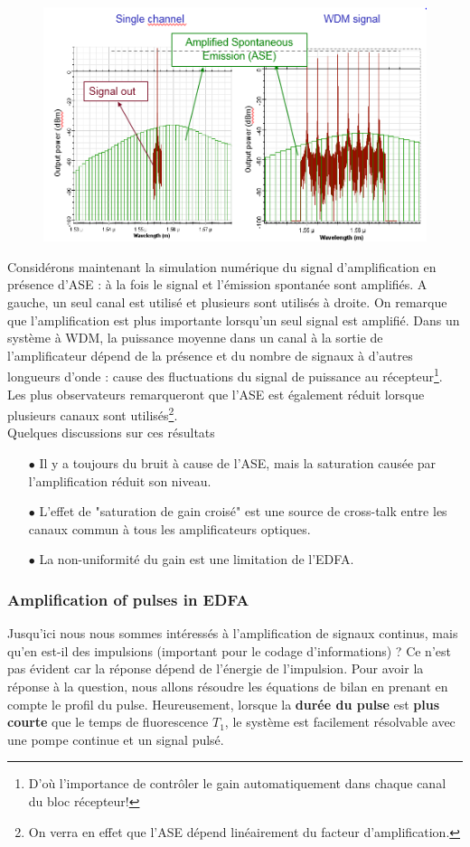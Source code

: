 	\begin{figure}
	\vspace{-11mm}
	\includegraphics[scale=0.5]{ch6/image9}
	\end{figure}
Considérons maintenant la simulation numérique du signal d'amplification en présence d'ASE : à la 
fois le signal et l'émission spontanée sont amplifiés. A gauche, un seul canal est utilisé et 
plusieurs sont utilisés à droite. On remarque que l'amplification est plus importante lorsqu'un seul
signal est amplifié. Dans un système à WDM, la puissance moyenne dans un canal à la sortie de 
l'amplificateur dépend de la présence et du nombre de signaux à d'autres longueurs d'onde : cause
des fluctuations du signal de puissance au récepteur\footnote{D'où l'importance de contrôler le gain
automatiquement dans chaque canal du bloc récepteur!}. Les plus observateurs remarqueront que l'ASE
est également réduit lorsque plusieurs canaux sont utilisés\footnote{On verra en effet que l'ASE dépend linéairement du facteur d'amplification.}. \\

Quelques discussions sur ces résultats
\begin{itemize}
\item[$\bullet$] Il y a toujours du bruit à cause de l'ASE, mais la saturation causée par 
l'amplification réduit son niveau.
\item[$\bullet$] L'effet de "saturation de gain croisé" est une source de cross-talk entre les
canaux commun à tous les amplificateurs optiques.
\item[$\bullet$] La non-uniformité du gain est une limitation de l'EDFA.
\end{itemize}


\subsubsection{Amplification of pulses in EDFA}
Jusqu'ici nous nous sommes intéressés à l'amplification de signaux continus, mais qu'en est-il des
impulsions (important pour le codage d'informations) ? Ce n'est pas évident car la réponse 
dépend de l'énergie de l'impulsion. Pour avoir la réponse à la question, nous allons résoudre les 
équations de bilan en prenant en compte le profil du pulse. Heureusement, lorsque la \textbf{durée du
pulse} est \textbf{plus courte} que le temps de fluorescence $T_1$, le système est facilement
résolvable avec une pompe continue et un signal pulsé. \\


